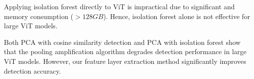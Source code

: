 \documentclass[conference]{IEEEtran}
\begin{document}
Applying isolation forest directly to ViT is impractical due to significant and memory consumption ($>128GB$). Hence, isolation forest alone is not effective for large ViT models.

Both PCA with cosine similarity detection and PCA with isolation forest show that the pooling amplification algorithm \cite{betterTogether} degrades detection performance in large ViT models. However, our feature layer extraction method significantly improves detection accuracy.

\begin{table}[htbp]
    \caption{Label Flip Defense Result}
    \vspace{-18pt}  %
    \begin{center}
    \label{tab:labelFlip}
    \end{center}
    \vspace{-10px}
\end{table}
\end{document}
